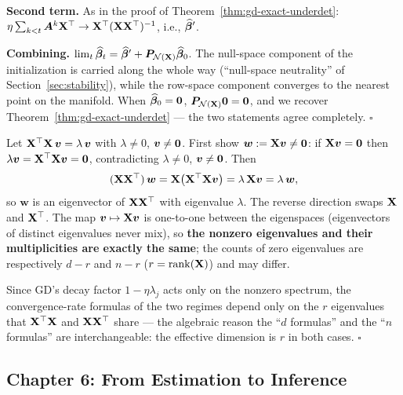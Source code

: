 \begin{description}[style=nextline, itemsep=1.2ex]
\textbf{Second term.} As in the proof of Theorem~\ref{thm:gd-exact-underdet}: $\eta\sum_{k<t}\bm{A}^k\mathbf{X}^\top \to \mathbf{X}^\top(\mathbf{X}\mathbf{X}^\top)^{-1}$, i.e., $\widehat{\bm{\beta}}'$.

\textbf{Combining.} $\lim_t \widehat{\bm{\beta}}_t = \widehat{\bm{\beta}}' + \bm{P}_{\mathcal{N}(\mathbf{X})}\widehat{\bm{\beta}}_0$. The null-space component of the initialization is carried along the whole way (``null-space neutrality'' of Section~\ref{sec:stability}), while the row-space component converges to the nearest point on the manifold. When $\widehat{\bm{\beta}}_0 = \mathbf{0}$, $\bm{P}_{\mathcal{N}(\mathbf{X})}\mathbf{0} = \mathbf{0}$, and we recover Theorem~\ref{thm:gd-exact-underdet} --- the two statements agree completely. $\square$

\item[Exercise \ref{ex:spectrum} (the nonzero spectra of $\X^\top\X$ and $\X\X^\top$ coincide)]
Let $\mathbf{X}^\top\mathbf{X}\,\bm{v} = \lambda\,\bm{v}$ with $\lambda \neq 0$, $\bm{v} \neq \mathbf{0}$. First show $\bm{w} := \mathbf{X}\bm{v} \neq \mathbf{0}$: if $\mathbf{X}\bm{v} = \mathbf{0}$ then $\lambda\bm{v} = \mathbf{X}^\top\mathbf{X}\bm{v} = \mathbf{0}$, contradicting $\lambda \neq 0$, $\bm{v} \neq \mathbf{0}$. Then
\[
  (\mathbf{X}\mathbf{X}^\top)\,\bm{w} = \mathbf{X}\big(\mathbf{X}^\top\mathbf{X}\bm{v}\big) = \lambda\,\mathbf{X}\bm{v} = \lambda\,\bm{w},
\]
so $\bm{w}$ is an eigenvector of $\X\X^\top$ with eigenvalue $\lambda$. The reverse direction swaps $\mathbf{X}$ and $\mathbf{X}^\top$. The map $\bm{v} \mapsto \mathbf{X}\bm{v}$ is one-to-one between the eigenspaces (eigenvectors of distinct eigenvalues never mix), so \textbf{the nonzero eigenvalues and their multiplicities are exactly the same}; the counts of zero eigenvalues are respectively $d - r$ and $n - r$ ($r = \mathrm{rank}(\mathbf{X})$) and may differ.

Since GD's decay factor $1 - \eta\lambda_j$ acts only on the nonzero spectrum, the convergence-rate formulas of the two regimes depend only on the $r$ eigenvalues that $\X^\top\X$ and $\X\X^\top$ share --- the algebraic reason the ``$d$ formulas'' and the ``$n$ formulas'' are interchangeable: the effective dimension is $r$ in both cases. $\square$
\end{description}

\subsection{Chapter 6: From Estimation to Inference}

